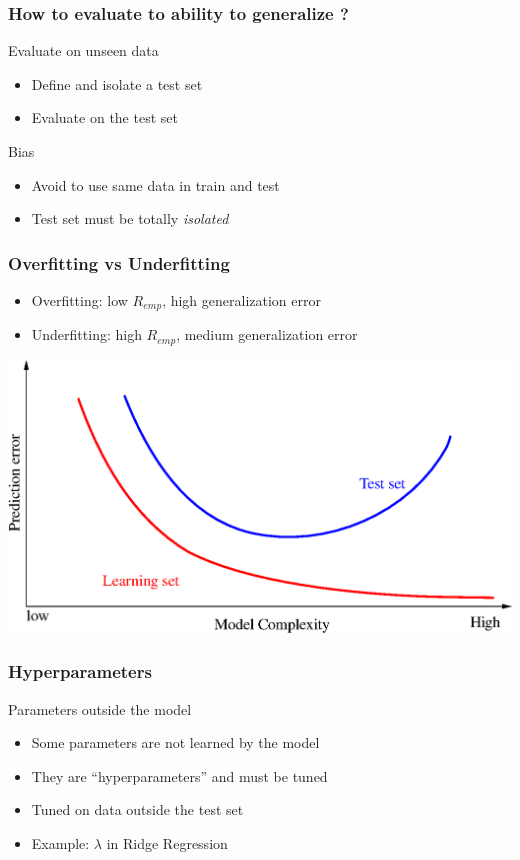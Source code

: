 \documentclass[11pt, pdf, compress, handout]{beamer}
\begin{document}
\begin{frame}
  \frametitle{How to evaluate to ability to generalize ?}
  \begin{block}{Evaluate on unseen data}
    \begin{itemize}
    \item Define and isolate a test set
    \item Evaluate on the test set
    \end{itemize}
  \end{block}
  \begin{block}{Bias}
    \begin{itemize}
    \item Avoid to use same data in train and test
    \item Test set must be totally \emph{isolated}
    \end{itemize}
  \end{block}
\end{frame}

\begin{frame}
  \frametitle{Overfitting vs Underfitting}
  \begin{itemize}
  \item Overfitting: low $R_{emp}$, high generalization error
  \item Underfitting: high $R_{emp}$, medium generalization error
  \end{itemize}

  \begin{center}
    \includegraphics[width=.8\textwidth]{complexite}
  \end{center}
\end{frame}


\begin{frame}
  \frametitle{Hyperparameters}
  \begin{block}{Parameters outside the model}
    \begin{itemize}
    \item Some parameters are not learned by the model
    \item They are ``hyperparameters'' and must be tuned
    \item \danger Tuned on data outside the test set
    \item Example: $\lambda$ in Ridge Regression
    \end{itemize}
  \end{block}
\end{frame}
\end{document}
